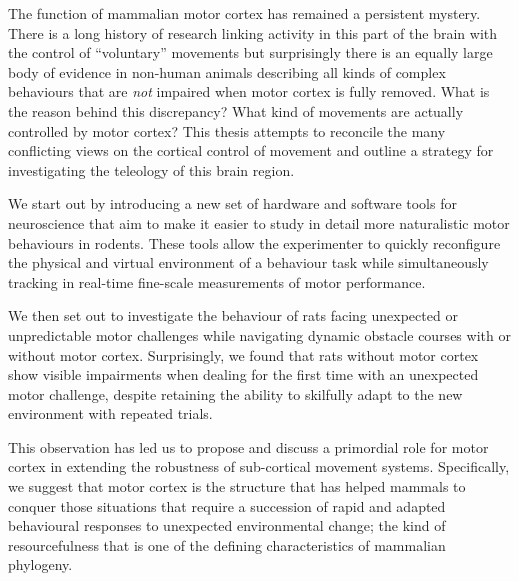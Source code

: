 \label{ch:abstract}

The function of mammalian motor cortex has remained a persistent mystery. There is a long history of research linking activity in this part of the brain with the control of ``voluntary'' movements but surprisingly there is an equally large body of evidence in non-human animals describing all kinds of complex behaviours that are \emph{not} impaired when motor cortex is fully removed. What is the reason behind this discrepancy? What kind of movements are actually controlled by motor cortex? This thesis attempts to reconcile the many conflicting views on the cortical control of movement and outline a strategy for investigating the teleology of this brain region.

We start out by introducing a new set of hardware and software tools for neuroscience that aim to make it easier to study in detail more naturalistic motor behaviours in rodents. These tools allow the experimenter to quickly reconfigure the physical and virtual environment of a behaviour task while simultaneously tracking in real-time fine-scale measurements of motor performance.

We then set out to investigate the behaviour of rats facing unexpected or unpredictable motor challenges while navigating dynamic obstacle courses with or without motor cortex. Surprisingly, we found that rats without motor cortex show visible impairments when dealing for the first time with an unexpected motor challenge, despite retaining the ability to skilfully adapt to the new environment with repeated trials.

This observation has led us to propose and discuss a primordial role for motor cortex in extending the robustness of sub-cortical movement systems. Specifically, we suggest that motor cortex is the structure that has helped mammals to conquer those situations that require a succession of rapid and adapted behavioural responses to unexpected environmental change; the kind of resourcefulness that is one of the defining characteristics of mammalian phylogeny.
